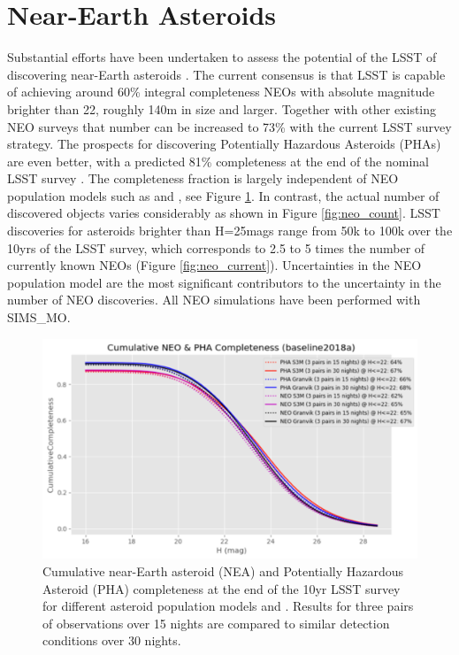 \section{Near-Earth Asteroids}\label{sec:neo}
Substantial efforts have been undertaken to assess the potential of the \gls{LSST} of discovering near-Earth asteroids \citep[e.g.][]{ivezic2006lsst,jones2015asteroid,grav2016modeling,veres2017near,veres2017high,jones2018large,ivezic2019lsst}. The current consensus is that \gls{LSST} is capable of achieving around 60\% integral completeness NEOs with absolute magnitude brighter than 22, roughly 140m in size and larger. Together with other existing \gls{NEO} surveys that number can be increased to 73\% with the current \gls{LSST} survey strategy. The prospects for discovering Potentially Hazardous Asteroids (PHAs) are even better, with a predicted 81\% completeness at the end of the nominal \gls{LSST} survey \citep{ivezic2019lsst}. The completeness fraction is largely independent of \gls{NEO} population models such as \citep[S3M,][]{s3m} and \citet{granvik2018neos}, see Figure \ref{fig:neo_compl}. In contrast, the actual number of discovered objects varies considerably as shown in Figure \ref{fig:neo_count}. \gls{LSST} discoveries for asteroids brighter than H=25mags range from 50k to 100k over the 10yrs of the \gls{LSST} survey, which corresponds to 2.5 to 5 times the number of currently known NEOs (Figure \ref{fig:neo_current}).
Uncertainties in the \gls{NEO} population model are the most significant contributors to the uncertainty in the number of \gls{NEO} discoveries. All \gls{NEO} simulations have been performed with SIMS\_MO.
\begin{figure}[tb!]
\begin{center}
\includegraphics[width=0.65\linewidth]{figs/neo2.png}
\end{center}
\caption{Cumulative near-Earth asteroid (NEA) and Potentially Hazardous Asteroid (\gls{PHA}) completeness at the end of the 10yr \gls{LSST} survey for different asteroid population models \citep[S3M,][]{s3m} and \citet{granvik2018neos}. Results for three pairs of observations over 15 nights are compared to similar detection conditions over 30 nights.}
\label{fig:neo_compl}       %
\end{figure}

